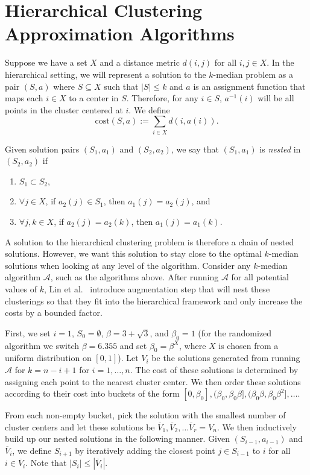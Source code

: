 \documentclass{article}
\begin{document}
\section{Hierarchical Clustering Approximation Algorithms}
Suppose we have a set $X$ and a distance metric $d(i,j)$ for all $i,j \in X$. In the hierarchical setting, we will represent a solution to the $k$-median problem as a pair $(S, a)$ where $S \subseteq X$ such that $|S| \leq k$ and $a$ is an assignment function that maps each $i \in X$ to a center in $S$. Therefore, for any $i \in S$, $a^{-1}(i)$ will be all points in the cluster centered at $i$. We define
\[ \mathrm{cost}(S,a) := \sum_{i \in X} d(i, a(i)) . \]

Given solution pairs $(S_1, a_1)$ and $(S_2, a_2)$, we say that $(S_1, a_1)$ is \emph{nested} in $(S_2, a_2)$ if 
\begin{enumerate}
\item $S_1 \subset S_2$, 
\item  $\forall  j \in X$, if $a_2(j) \in S_1$, then $a_1(j) = a_2(j)$, and 
\item $\forall j, k \in X$, if $a_2(j) = a_2(k)$, then $a_1(j) = a_1(k)$.
\end{enumerate}
 A solution to the hierarchical clustering problem is therefore a chain of nested solutions. However, we want this solution to stay close to the optimal $k$-median solutions when looking at any level of the algorithm.  
Consider any $k$-median algorithm $\mathcal{A}$, such as the algorithms above. After running $\mathcal{A}$ for all potential values of $k$, Lin et al.~\cite{Lin} introduce  augmentation step that will nest these clusterings so that they fit into the hierarchical framework and only increase the costs by a bounded factor. 

First, we set $i=1$, $S_0 = \emptyset$, $\beta = 3+\sqrt{3}$, and $\beta_0 = 1$ (for the randomized algorithm we switch $\beta = 6.355$ and set $\beta_0 = \beta^X$, where $X$ is chosen from a uniform distribution on $[0,1]$). Let $V_i$ be the solutions generated from running $\mathcal{A}$ for $k=n-i+1$ for $i=1, \ldots, n$. The cost of these solutions is determined by assigning each point to the nearest cluster center. We then order these solutions according to their cost into buckets of the form $[0,\beta_0], (\beta_0, \beta_0 \beta], (\beta_0 \beta, \beta_0 \beta^2], \ldots $. 

From each non-empty bucket, pick the solution with the smallest number of cluster centers and let these solutions be $\overline{V}_1, \overline{V}_2, \ldots \overline{V}_r = V_n$. We then inductively build up our nested solutions in the following manner. Given $(S_{i-1}, a_{i-1})$ and $\overline{V}_i$, we define $S_{i+1}$ by iteratively adding the closest point $j \in S_{i-1}$ to $i$ for all $i \in \overline{V}_i$. Note that $|S_{i}| \leq |\overline{V}_i|$. 
\end{document}
